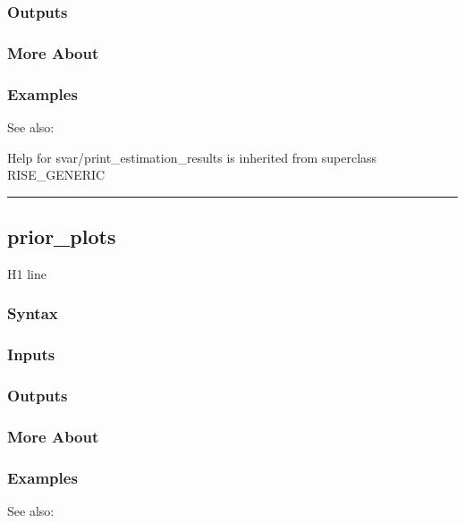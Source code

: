\documentclass[letterpaper,10pt,english]{sphinxmanual}
\begin{document}
\subsubsection{Outputs}
\label{classes/models/@svar/svar:id85}

\subsubsection{More About}
\label{classes/models/@svar/svar:id86}

\subsubsection{Examples}
\label{classes/models/@svar/svar:id87}
See also:

Help for svar/print\_estimation\_results is inherited from superclass RISE\_GENERIC


\bigskip\hrule{}\bigskip



\subsection{prior\_plots}
\label{classes/models/@svar/svar:id88}\label{classes/models/@svar/svar:prior-plots}
H1 line


\subsubsection{Syntax}
\label{classes/models/@svar/svar:id89}

\subsubsection{Inputs}
\label{classes/models/@svar/svar:id90}

\subsubsection{Outputs}
\label{classes/models/@svar/svar:id91}

\subsubsection{More About}
\label{classes/models/@svar/svar:id92}

\subsubsection{Examples}
\label{classes/models/@svar/svar:id93}
See also:
\end{document}
